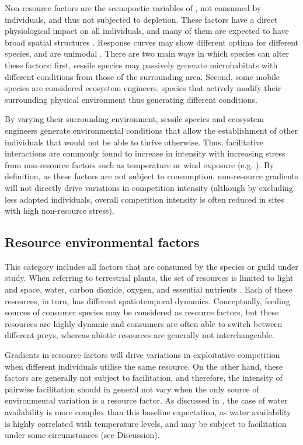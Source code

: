 Non-resource factors are the scenopoetic variables of \cite{Hutchinson1978}, not consumed by individuals, and thus not subjected to depletion. These factors have a direct physiological impact on all individuals, and many of them are expected to have broad spatial structures \citep{Soberon2007}. Response curves may show different optima for different species, and are unimodal \citep{Austin1990}. There are two main ways in which species can alter these factors: first, sessile species may passively generate microhabitats with different conditions from those of the surrounding area. Second, some mobile species are considered ecosystem engineers, species that actively modify their surrounding physical environment thus generating different conditions.

By varying their surrounding environment, sessile species and ecosystem engineers generate environmental conditions that allow the establishment of other individuals that would not be able to thrive otherwise. Thus, facilitative interactions are commonly found to increase in intensity with increasing stress from non-resource factors such as temperature or wind exposure (e.g. \citealt{Fajardo2011}). By definition, as these factors are not subject to consumption, non-resource gradients will not directly drive variations in competition intensity (although by excluding less adapted individuals, overall competition intensity is often reduced in sites with high non-resource stress).

\subsection{Resource environmental factors}

This category includes all factors that are consumed by the species or guild under study. When referring to terrestrial plants, the set of resources is limited to light and space, water, carbon dioxide, oxygen, and essential nutrients \citep{Austin1990}. Each of these resources, in turn, has different spatiotemporal dynamics. Conceptually, feeding sources of consumer species may be considered as resource factors, but these resources are highly dynamic and consumers are often able to switch between different preys, whereas abiotic resources are generally not interchangeable.

Gradients in resource factors will drive variations in exploitative competition when different individuals utilise the same resource. On the other hand, these factors are generally not subject to facilitation, and therefore, the intensity of pairwise facilitation should in general not vary when the only source of environmental variation is a resource factor. As discussed in \cite{Maestre2009}, the case of water availability is more complex than this baseline expectation, as water availability is highly correlated with temperature levels, and may be subject to facilitation under some circumstances (see Discussion).

